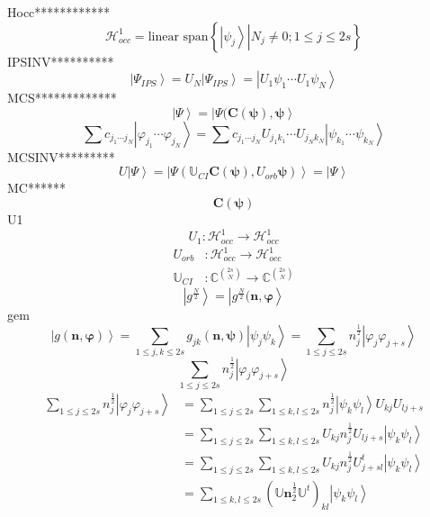\documentclass[aps,preprint]{revtex4}%
\begin{document}
Hocc************%
\[
\mathcal{H}_{occ}^{1}=\text{linear span}\left\{  \left.  \left\vert \psi
_{j}\right\rangle \right\vert N_{j}\neq0;1\leq j\leq2s\right\}
\]
IPSINV**********%
\[
\left\vert \Psi_{IPS}\right\rangle =U_{N}\left\vert \Psi_{IPS}\right\rangle
=\left\vert U_{1}\psi_{1}\cdots U_{1}\psi_{N}\right\rangle
\]
MCS*************%
\[
\left\vert \Psi\right\rangle =\left\vert \Psi(\mathbf{C}\left(  \mathbf{\psi
}\right)  ,\mathbf{\psi}\right\rangle
\]%
\begin{equation}
\sum c_{j_{1}\cdots j_{N}}\left\vert \varphi_{j_{1}}\cdots\varphi_{j_{N}%
}\right\rangle =\sum c_{j_{1}\cdots j_{N}}U_{j_{1}k_{1}}\cdots U_{j_{N}k_{N}%
}\left\vert \psi_{k_{1}}\cdots\psi_{k_{N}}\right\rangle
\end{equation}
MCSINV*********%
\[
U\left\vert \Psi\right\rangle =\left\vert \Psi\left(  \mathbb{U}%
_{CI}\mathbf{C}\left(  \mathbf{\psi}\right)  ,U_{orb}\mathbf{\psi}\right)
\right\rangle =\left\vert \Psi\right\rangle
\]
MC******%
\[
\mathbf{C}\left(  \mathbf{\psi}\right)
\]
U1%
\[
U_{1}:\mathcal{H}_{occ}^{1}\rightarrow\mathcal{H}_{occ}^{1}%
\]%
\begin{align*}
U_{orb}  &  :\mathcal{H}_{occ}^{1}\rightarrow\mathcal{H}_{occ}^{1}\\
\mathbb{U}_{CI}  &  :\mathbb{C}^{\binom{2s}{N}}\rightarrow\mathbb{C}%
^{\binom{2s}{N}}%
\end{align*}%
\[
\left\vert g^{\frac{N}{2}}\right\rangle =\left\vert g^{\frac{N}{2}}%
(\mathbf{n},\mathbf{\varphi}\right\rangle
\]
gem%
\[
\left\vert g\left(  \mathbf{n},\mathbf{\varphi}\right)  \right\rangle
=\sum_{1\leq j,k\leq2s}g_{jk}\left(  \mathbf{n},\mathbf{\psi}\right)
\left\vert \psi_{j}\psi_{k}\right\rangle =\sum_{1\leq j\leq2s}n_{j}^{\frac
{1}{2}}\left\vert \varphi_{j}\varphi_{j+s}\right\rangle
\]%
\begin{equation}
\sum_{1\leq j\leq2s}n_{j}^{\frac{1}{2}}\left\vert \varphi_{j}\varphi
_{j+s}\right\rangle
\end{equation}%
\begin{align}
\sum_{1\leq j\leq2s}n_{j}^{\frac{1}{2}}\left\vert \varphi_{j}\varphi
_{j+s}\right\rangle  &  =\sum_{1\leq j\leq2s}\sum_{1\leq k,l\leq2s}%
n_{j}^{\frac{1}{2}}\left\vert \psi_{k}\psi_{l}\right\rangle U_{kj}U_{lj+s}\\
&  =\sum_{1\leq j\leq2s}\sum_{1\leq k,l\leq2s}U_{kj}n_{j}^{\frac{1}{2}%
}U_{lj+s}\left\vert \psi_{k}\psi_{l}\right\rangle \\
&  =\sum_{1\leq j\leq2s}\sum_{1\leq k,l\leq2s}U_{kj}n_{j}^{\frac{1}{2}%
}U_{j+sl}^{t}\left\vert \psi_{k}\psi_{l}\right\rangle \\
&  =\sum_{1\leq k,l\leq2s}\left(  \mathbb{U}\mathbf{n}_{2}^{\frac{1}{2}%
}\mathbb{U}^{t}\right)  _{kl}\left\vert \psi_{k}\psi_{l}\right\rangle
\end{align}
\end{document}
